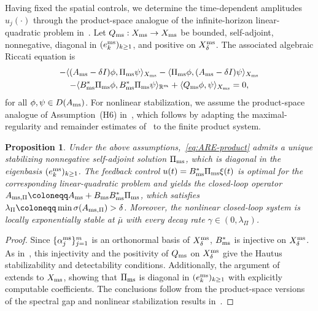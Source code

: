\documentclass[letterpaper, 10pt, conference]{ieeeconf}
\newtheorem{proposition}[theorem]{Proposition}
\newcommand{\R}{\mathbb{R}}
\begin{document}
Having fixed the spatial controls, we determine the time-dependent amplitudes $u_j(\cdot)$ through the product-space analogue of the infinite-horizon linear-quadratic problem in~\cite[Sec.~4.2]{KaliseMoschenPavliotis2026}.
Let $Q_{\rm ms} : X_{\rm ms} \to X_{\rm ms}$ be bounded, self-adjoint, nonnegative, diagonal in $(e_k^{\rm ms})_{k \ge 1}$, and positive on $X_\delta^{\rm ms}$. 
The associated algebraic Riccati equation is
\begin{multline}
    \label{eq:ARE-product}
    -\langle(A_{\rm ms}-\delta I)\phi,\Pi_{\rm ms}\psi\rangle_{X_{\rm ms}}
    -\langle\Pi_{\rm ms}\phi,(A_{\rm ms}-\delta I)\psi\rangle_{X_{\rm ms}}\\
    -\langle B_{\rm ms}^\ast\Pi_{\rm ms}\phi,B_{\rm ms}^\ast\Pi_{\rm ms}\psi\rangle_{\R^m}
    +\langle Q_{\rm ms}\phi,\psi\rangle_{X_{\rm ms}}=0,
\end{multline}
for all $\phi, \psi \in D(A_{\rm ms})$. 
For nonlinear stabilization, we assume the product-space analogue of Assumption~(H6) in~\cite{KaliseMoschenPavliotis2026}, which follows by adapting the maximal-regularity and remainder estimates of~\cite[Sec.~3.4]{KaliseMoschenPavliotis2025} to the finite product system.

\begin{proposition}
    \label{prop:full_modal_feedback}
    Under the above assumptions,~\eqref{eq:ARE-product} admits a unique stabilizing nonnegative self-adjoint solution $\Pi_{\rm ms}$, which is diagonal in the eigenbasis $(e_k^{\rm ms})_{k \ge 1}$.
    The feedback control $u(t) = B_{\rm ms}^\ast\Pi_{\rm ms}\xi(t)$ is optimal for the corresponding linear-quadratic problem and yields the closed-loop operator $A_{{\rm ms},\Pi} \coloneqq A_{\rm ms} + B_{\rm ms}B_{\rm ms}^\ast \Pi_{\rm ms}$, which satisfies $\lambda_\Pi \coloneqq \min\sigma(A_{{\rm ms},\Pi}) > \delta$.
    Moreover, the nonlinear closed-loop system is locally exponentially stable at $\bar\mu$ with every decay rate $\gamma \in (0, \lambda_\Pi)$.
\end{proposition}

\begin{proof}
    Since $\{\alpha_j^{\rm ms}\}_{j=1}^m$ is an orthonormal basis of $X_\delta^{\rm ms}$, $B_{\rm ms}^\ast$ is injective on $X_\delta^{\rm ms}$.
    As in~\cite[Prop.~4.3]{KaliseMoschenPavliotis2026}, this injectivity and the positivity of $Q_{\rm ms}$ on $X_\delta^{\rm ms}$ give the Hautus stabilizability and detectability conditions.
    Additionally, the argument of~\cite[Prop.~4.4]{KaliseMoschenPavliotis2026} extends to $X_{\rm ms}$, showing that $\Pi_{\rm ms}$ is diagonal in $(e_k^{\rm ms})_{k \ge 1}$ with explicitly computable coefficients.
    The conclusions follow from the product-space versions of the spectral gap and nonlinear stabilization results in~\cite[Cor.~4.5 and Thm.~4.12]{KaliseMoschenPavliotis2026}.
\end{proof}
\end{document}
